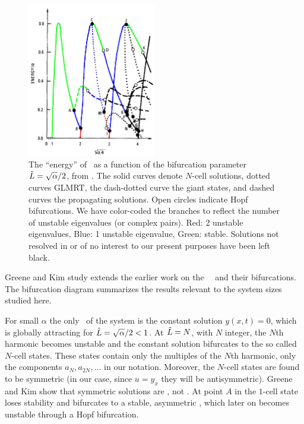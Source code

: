 \begin{description}
\begin{figure} \label{fig:GreeneKim}
\centering
\includegraphics[width=0.5\textwidth, clip=true]
                {../rpo_ks/figsUnused/GreeneKimBifColor}
\caption[The ``energy'' of \eqva\ as a function of the bifurcation parameter]
        {
The ``energy'' of \eqva\ as a function of the bifurcation
parameter $\tilde{L}=\sqrt{\alpha}/2$, from .
The solid curves denote $N$-cell solutions,
dotted curves GLMRT, the dash-dotted curve the
giant states, and dashed curves the propagating solutions.
Open circles indicate Hopf bifurcations.
We have color-coded the branches to reflect the number of unstable
eigenvalues (or complex pairs). Red: 2 unstable eigenvalues, Blue: 1
unstable eigenvalue, Green: stable. Solutions not
resolved in  or of no interest
to our present purposes have been left black.
        }
\end{figure}

Greene and Kim study extends the earlier work
on the \KS\ \eqva\ and their bifurcations. The
bifurcation diagram  summarizes the results
relevant to the system sizes studied here.

For small $\alpha$ the only \eqv\ of the system is the constant solution
$y(x,t)=0$, which is globally attracting for $\tilde{L}=\sqrt{\alpha}/2<1$.
At $\tilde{L}=N$, with $N$ integer, the $N$th harmonic becomes unstable and
the constant solution bifurcates to the so called $N$-cell states. These
states contain only the multiples of the $N$th harmonic, {\ie} only the
components $a_N,a_{2N},...$ in our notation. Moreover, the $N$-cell
states are found to be symmetric (in our case, since $u=y_x$ they will be
antisymmetric). Greene and Kim show that symmetric solutions are \eqva,
not \reqva. At point $A$ in  the $1$-cell state
loses stability and bifurcates to a stable, asymmetric \reqv, which later
on becomes unstable through a Hopf bifurcation.


\end{description}
